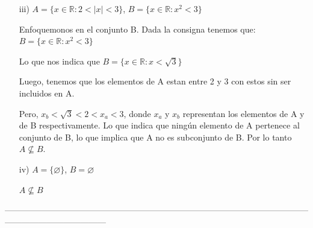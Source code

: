 \documentclass[10pt]{article}
\begin{document}
\begin{ej}
\begin{itemize}
\item[iii)] $A=\{x \in \mathbb{R} : 2 < |x| <3\}$, $B=\{x \in \mathbb{R} : x^2 < 3\}$

Enfoquemonos en el conjunto B. Dada la consigna tenemos que:
\textcolor{B}{$B=\{x \in \mathbb{R}  : x^2 < 3\}$}

Lo que nos indica que \textcolor{B}{$B=\{x \in \mathbb{R} : x < \sqrt{3}\}$}

Luego, tenemos que los elementos de A estan entre 2 y 3 con estos sin ser incluidos en A. 

Pero, \textcolor{B}{$x_b < \sqrt{3} < 2 < x_a < 3$}, donde $x_a$ y $x_b$ representan los elementos de A y de B respectivamente. 
Lo que indica que ningún elemento de A pertenece al conjunto de B, lo que implica que A no es subconjunto de B. Por lo tanto \textcolor{R}{$A \not\subseteq B$}.

\item[iv)] $A=\{\varnothing\}$, $B=\varnothing$ 

\textcolor{R}{$A \not\subseteq B$}
\end{itemize}
\end{ej}
------------------------------------------------------------------------------------------------------------------------------------------------
\end{document}
